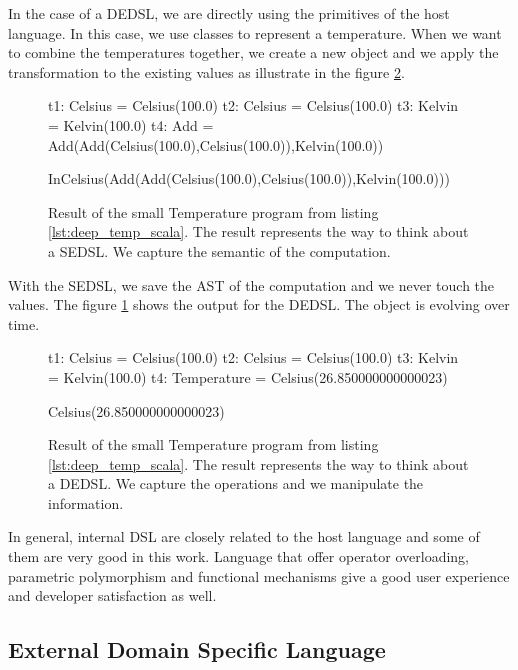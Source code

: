 In the case of a \gls{DEDSL}, we are directly using the primitives of the host
language. In this case, we use classes to represent a temperature. When we want
to combine the temperatures together, we create a new object and we apply the
transformation to the existing values as illustrate in the figure \ref{fig:dsl_deep_result}.

\begin{figure}[ht]
  \centering
  \begin{scalacode}
t1: Celsius = Celsius(100.0)
t2: Celsius = Celsius(100.0)
t3: Kelvin = Kelvin(100.0)
t4: Add = Add(Add(Celsius(100.0),Celsius(100.0)),Kelvin(100.0))

InCelsius(Add(Add(Celsius(100.0),Celsius(100.0)),Kelvin(100.0)))
  \end{scalacode}
  \caption[Result of the \gls{SEDSL} for Temperature]{Result of the small
    Temperature program from listing \ref{lst:deep_temp_scala}. The result
    represents the way to think about a \gls{SEDSL}. We capture the semantic of
    the computation.}
  \label{fig:dsl_shallow_result}
\end{figure}

With the \gls{SEDSL}, we save the \gls{AST} of the computation and we never
touch the values. The figure \ref{fig:dsl_shallow_result} shows the output for
the \gls{DEDSL}. The object is evolving over time.

\begin{figure}[ht]
  \centering
  \begin{scalacode}
t1: Celsius = Celsius(100.0)
t2: Celsius = Celsius(100.0)
t3: Kelvin = Kelvin(100.0)
t4: Temperature = Celsius(26.850000000000023)

Celsius(26.850000000000023)
  \end{scalacode}
  \caption[Result of the \gls{DEDSL} for Temperature]{Result of the small
    Temperature program from listing \ref{lst:deep_temp_scala}. The result
    represents the way to think about a \gls{DEDSL}. We capture the operations and
  we manipulate the information.}
  \label{fig:dsl_deep_result}
\end{figure}

In general, internal \gls{DSL} are closely related to the host language and some
of them are very good in this work. Language that offer operator overloading,
parametric polymorphism and functional mechanisms give a good user experience
and developer satisfaction as well.

\subsection{External Domain Specific Language}
\label{sec:external_dsl}

